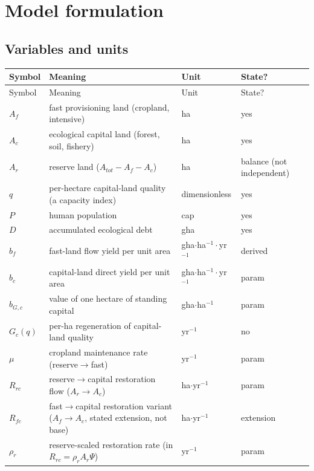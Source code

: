 \documentclass[11pt]{article}
\begin{document}
\section{Model formulation}

\subsection{Variables and units}

\small
\begin{longtable}{>{\raggedright\arraybackslash}p{}>{\raggedright\arraybackslash}p{}>{\raggedright\arraybackslash}p{}>{\raggedright\arraybackslash}p{}}
\toprule
Symbol & Meaning & Unit & State? \\
\midrule
\endfirsthead
\toprule
Symbol & Meaning & Unit & State? \\
\midrule
\endhead
$A_f$ & fast provisioning land (cropland, intensive) & ha & yes \\
$A_c$ & ecological capital land (forest, soil, fishery) & ha & yes \\
$A_r$ & reserve land ($A_{tot}-A_f-A_c$) & ha & balance (not independent) \\
$q$ & per-hectare capital-land quality (a capacity index) & dimensionless & yes \\
$P$ & human population & cap & yes \\
$D$ & accumulated ecological debt & gha & yes \\
$b_f$ & fast-land flow yield per unit area & gha$\cdot$ha$^{-1}\cdot$yr$^{-1}$ & derived \\
$b_c$ & capital-land direct yield per unit area & gha$\cdot$ha$^{-1}\cdot$yr$^{-1}$ & param \\
$b_{G,c}$ & value of one hectare of standing capital & gha$\cdot$ha$^{-1}$ & param \\
$G_c(q)$ & per-ha regeneration of capital-land quality & yr$^{-1}$ & no \\
$\mu$ & cropland maintenance rate (reserve$\to$fast) & yr$^{-1}$ & param \\
$R_{rc}$ & reserve$\to$capital restoration flow ($A_r\to A_c$) & ha$\cdot$yr$^{-1}$ & param \\
$R_{fc}$ & fast$\to$capital restoration variant ($A_f\to A_c$, stated extension, not base) & ha$\cdot$yr$^{-1}$ & extension \\
$\rho_r$ & reserve-scaled restoration rate (in $R_{rc}=\rho_r A_r \Psi$) & yr$^{-1}$ & param \\

\end{longtable}
\end{document}
